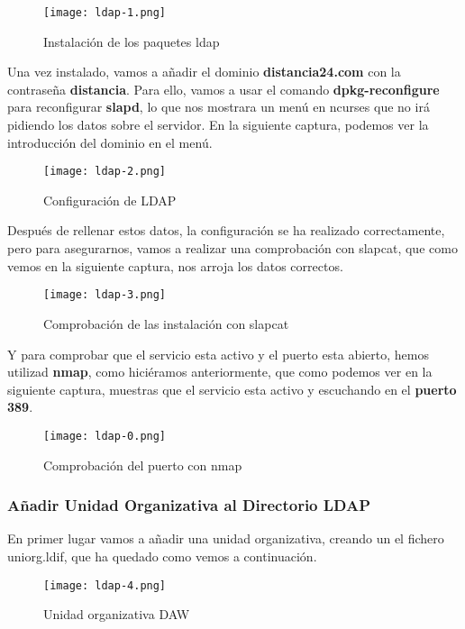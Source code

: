 \begin{figure}[H]
    \centering
    \texttt{[image: ldap-1.png]}
    \caption{Instalación de los paquetes ldap}
\end{figure}

Una vez instalado, vamos a añadir el dominio \textbf{distancia24.com} con la contraseña \textbf{distancia}. Para ello, vamos a usar el comando \textbf{dpkg-reconfigure} para reconfigurar \textbf{slapd}, lo que nos mostrara un menú en ncurses que no irá pidiendo los datos sobre el servidor. En la siguiente captura, podemos ver la introducción del dominio en el menú.

\begin{figure}[H]
    \centering
    \texttt{[image: ldap-2.png]}
    \caption{Configuración de LDAP}
\end{figure}

Después de rellenar estos datos, la configuración se ha realizado correctamente, pero para asegurarnos, vamos a realizar una comprobación con slapcat, que como vemos en la siguiente captura, nos arroja los datos correctos.

\begin{figure}[H]
    \centering
    \texttt{[image: ldap-3.png]}
    \caption{Comprobación de las instalación con slapcat}
\end{figure}

Y para comprobar que el servicio esta activo y el puerto esta abierto, hemos utilizad \textbf{nmap}, como hiciéramos anteriormente, que como podemos ver en la siguiente captura, muestras que el servicio esta activo y escuchando en el\textbf{ puerto 389}.

\begin{figure}[H]
    \centering
    \texttt{[image: ldap-0.png]}
    \caption{Comprobación del puerto con nmap}
\end{figure}


\subsubsection{Añadir Unidad Organizativa al Directorio LDAP}
En primer lugar vamos a añadir una unidad organizativa, creando un el fichero uniorg.ldif, que ha quedado como vemos a continuación.

\begin{figure}[H]
    \centering
    \texttt{[image: ldap-4.png]}
    \caption{Unidad organizativa DAW}
\end{figure}

